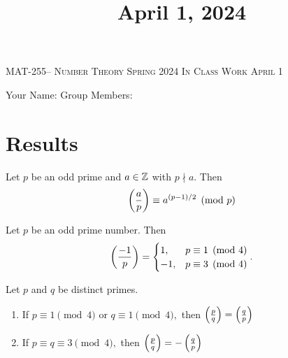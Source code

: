 \documentclass[handout]{ximera}
\title{April 1, 2024}
\begin{document}
\handoutAbstract
\maketitle
 	\begin{center}%
    	{\large \scshape MAT-255-- Number Theory 
			\hfill Spring 2024 
			\hfill In Class Work April 1}%
    
		{\large Your Name: \hrulefill \quad 
			Group Members:\hrulefill \quad 
			\hrulefill
			\par}%
 	\end{center}%
	 
\section*{Results}
\begin{theorem}\label{thm:euler-quads}
	Let $p$ be an odd prime and $a\in\mathbb Z$ with $p\nmid a.$ Then \[\left(\frac{a}{p}\right)\equiv a^{(p-1)/2}\pmod{p}\]
\end{theorem}


\begin{thm*}[Theorem 4.6]\label{thm:residue-neg1}
	Let $p$ be an odd prime number. Then 
	\[
		\left(\frac{-1}{p}\right)=
			\begin{cases}
 				1, & p\equiv 1\pmod{4}\\
				-1, & p\equiv 3\pmod{4}
			\end{cases}.
	\]
\end{thm*}

\begin{thm*}\label{quad-rec}
	Let $p$ and $q$ be distinct primes.  
	\begin{enumerate}[label=(\alph*)]
		\item If $p\equiv 1 \pmod{4}$ or $q\equiv 1\pmod{4},$ then $\left(\frac{p}{q}\right)=\left(\frac{q}{p}\right)$
 		\item If $p\equiv q \equiv 3 \pmod{4},$ then $\left(\frac{p}{q}\right)=-\left(\frac{q}{p}\right)$
	\end{enumerate}
\end{thm*}
\end{document}
